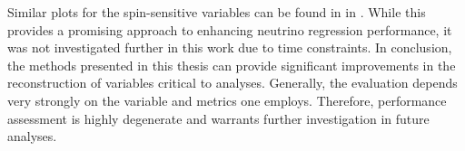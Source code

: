 Similar plots for the spin-sensitive variables can be found in  in . While this provides a promising approach to enhancing neutrino regression performance, it was not investigated further in this work due to time constraints.
In conclusion, the methods presented in this thesis can provide significant improvements in the reconstruction of variables critical to analyses. Generally, the evaluation depends very strongly on the variable and metrics one employs. Therefore, performance assessment is highly degenerate and warrants further investigation in future analyses.
